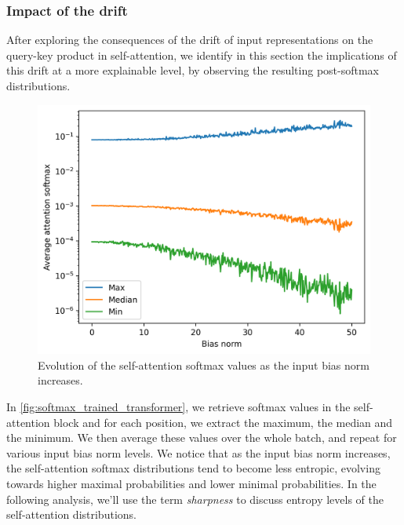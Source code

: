 \subsubsection{Impact of the drift}

After exploring the consequences of the drift of input representations on the query-key product in self-attention, we identify in this section the implications of this drift at a more explainable level, by observing the resulting post-softmax distributions.


\begin{figure}[ht]
    \centering
    \includegraphics[width=0.8\linewidth]{sources/part_1/anisotropy/imgs/untrained_bert_base_bias_vs_softmax.png}
    \caption{Evolution of the self-attention softmax values as the input bias norm increases.}
    \label{fig:softmax_trained_transformer}
\end{figure}

In \autoref{fig:softmax_trained_transformer}, we retrieve softmax values in the self-attention block and for each position, we extract the maximum, the median and the minimum. We then average these values over the whole batch, and repeat for various input bias norm levels. We notice that as the input bias norm increases, the self-attention softmax distributions tend to become less entropic, evolving towards higher maximal probabilities and lower minimal probabilities. In the following analysis, we'll use the term \textit{sharpness} to discuss entropy levels of the self-attention distributions.


